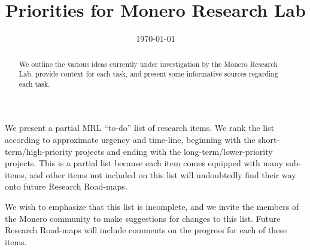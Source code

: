 \documentclass[12pt,english]{mrl}
\theoremstyle{definition}
\numberwithin{equation}{section}
\numberwithin{figure}{section}
\numberwithin{equation}{section}
\numberwithin{equation}{section}
\numberwithin{figure}{section}
\begin{document}
\begin{frontmatter}

\begin{fmbox}
\hfill\setlength{\fboxrule}{0px}\setlength{\fboxsep}{5px}
\title{Priorities for Monero Research Lab}
\date{\today}
\author[
   addressref={mrl},
   email={bggoode@g.clemson.edu}
]{ }


\address[id=mrl]{
}
\end{fmbox}

\begin{abstractbox}
\begin{abstract}
We outline the various ideas currently under investigation by the Monero Research Lab, provide context for each task, and present some informative sources regarding each task. \end{abstract}
\end{abstractbox}
\end{frontmatter}

We present a partial  MRL ``to-do'' list of research items. We rank the list according to approximate urgency and time-line, beginning with the short-term/high-priority projects and ending with the long-term/lower-priority projects. This is a partial list because each item comes equipped with many sub-items, and other items not included on this list will undoubtedly find their way onto future Research Road-maps.  

We wish to emphasize that this list is incomplete, and we invite the members of the Monero community to make suggestions for changes to this list. Future Research Road-maps will include comments on the progress for each of these items. 


\vspace{0.1in}
\end{document}
